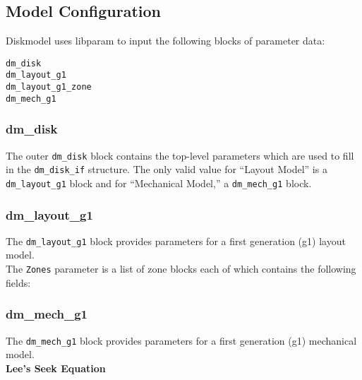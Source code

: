 
\subsection{Model Configuration}
Diskmodel uses libparam to input the following blocks of parameter data:

\begin{verbatim}
dm_disk
dm_layout_g1
dm_layout_g1_zone
dm_mech_g1
\end{verbatim}

\subsubsection{dm\_disk}

The outer \texttt{dm\_disk} block contains the top-level parameters
which are used to fill in the \texttt{dm\_disk\_if} structure.  The
only valid value for ``Layout Model'' is a \texttt{dm\_layout\_g1}
block and for ``Mechanical Model,'' a \texttt{dm\_mech\_g1} block.\\



\subsubsection{dm\_layout\_g1}

The \texttt{dm\_layout\_g1} block provides parameters for a first
generation (g1) layout model.\\



The \texttt{Zones} parameter is a list of zone blocks each of which
contains the following fields:\\



\subsubsection{dm\_mech\_g1}

The \texttt{dm\_mech\_g1} block provides parameters for a first
generation (g1) mechanical model.\\




\noindent\textbf{Lee's Seek Equation}
\label{seek.lee}

